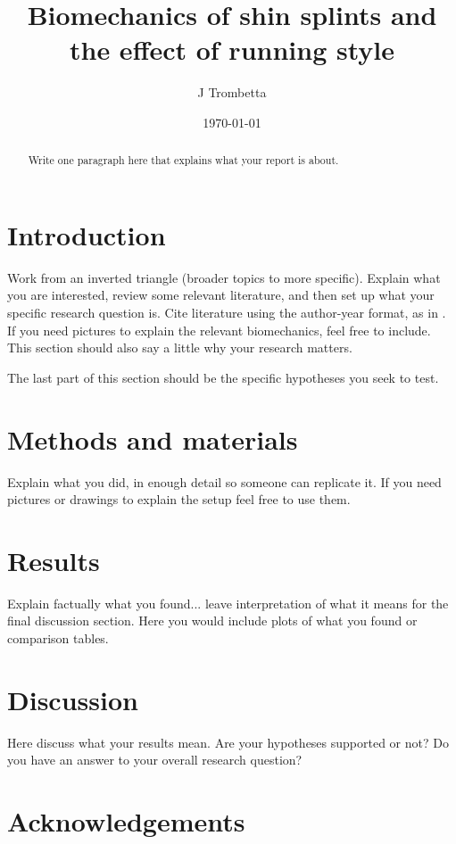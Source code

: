 \documentclass{article}
\title{Biomechanics of shin splints and the effect of running style}
\author{J Trombetta}
\date{\today}
\begin{document}
\maketitle
\begin{abstract}
Write one paragraph here that explains what your report is about.
\end{abstract}

\section{Introduction}

Work from an inverted triangle (broader topics to more specific). Explain what you are interested, review some relevant literature, and then set up what your specific research question is. Cite literature using the author-year format, as in \citep{buck2020go}. If you need pictures to explain the relevant biomechanics, feel free to include. This section should also say a little why your research matters. 

The last part of this section should be the specific hypotheses you seek to test. 

\section{Methods and materials}
Explain what you did, in enough detail so someone can replicate it. If you need pictures or drawings to explain the setup feel free to use them. 

\section{Results}
Explain factually what you found... leave interpretation of what it means for the final discussion section. Here you would include plots of what you found or comparison tables.

\section{Discussion}
Here discuss what your results mean. Are your hypotheses supported or not? Do you have an answer to your overall research question?

\section{Acknowledgements}


\end{document}
